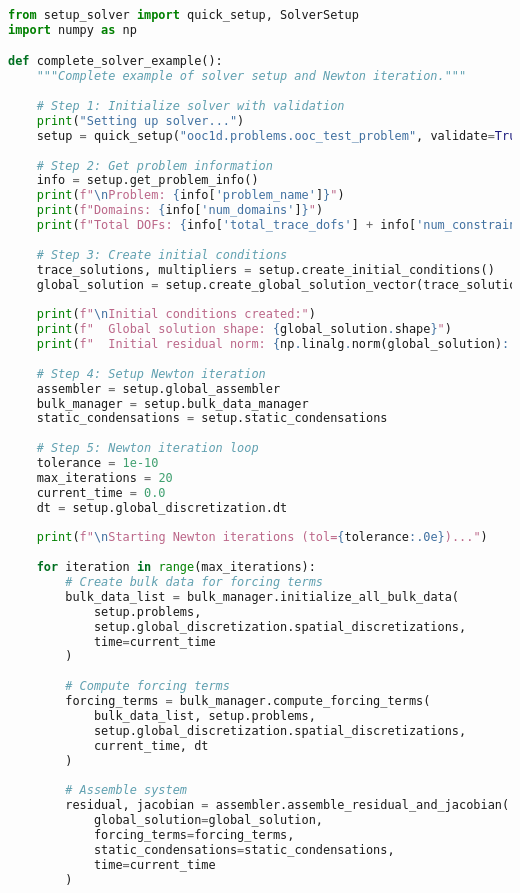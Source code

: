 \begin{lstlisting}[language=Python, caption=Complete Solver Setup Example]
from setup_solver import quick_setup, SolverSetup
import numpy as np

def complete_solver_example():
    """Complete example of solver setup and Newton iteration."""
    
    # Step 1: Initialize solver with validation
    print("Setting up solver...")
    setup = quick_setup("ooc1d.problems.ooc_test_problem", validate=True)
    
    # Step 2: Get problem information
    info = setup.get_problem_info()
    print(f"\nProblem: {info['problem_name']}")
    print(f"Domains: {info['num_domains']}")
    print(f"Total DOFs: {info['total_trace_dofs'] + info['num_constraints']}")
    
    # Step 3: Create initial conditions
    trace_solutions, multipliers = setup.create_initial_conditions()
    global_solution = setup.create_global_solution_vector(trace_solutions, multipliers)
    
    print(f"\nInitial conditions created:")
    print(f"  Global solution shape: {global_solution.shape}")
    print(f"  Initial residual norm: {np.linalg.norm(global_solution):.6e}")
    
    # Step 4: Setup Newton iteration
    assembler = setup.global_assembler
    bulk_manager = setup.bulk_data_manager
    static_condensations = setup.static_condensations
    
    # Step 5: Newton iteration loop
    tolerance = 1e-10
    max_iterations = 20
    current_time = 0.0
    dt = setup.global_discretization.dt
    
    print(f"\nStarting Newton iterations (tol={tolerance:.0e})...")
    
    for iteration in range(max_iterations):
        # Create bulk data for forcing terms
        bulk_data_list = bulk_manager.initialize_all_bulk_data(
            setup.problems,
            setup.global_discretization.spatial_discretizations,
            time=current_time
        )
        
        # Compute forcing terms
        forcing_terms = bulk_manager.compute_forcing_terms(
            bulk_data_list, setup.problems,
            setup.global_discretization.spatial_discretizations,
            current_time, dt
        )
        
        # Assemble system
        residual, jacobian = assembler.assemble_residual_and_jacobian(
            global_solution=global_solution,
            forcing_terms=forcing_terms,
            static_condensations=static_condensations,
            time=current_time
        )
        

\end{lstlisting}
